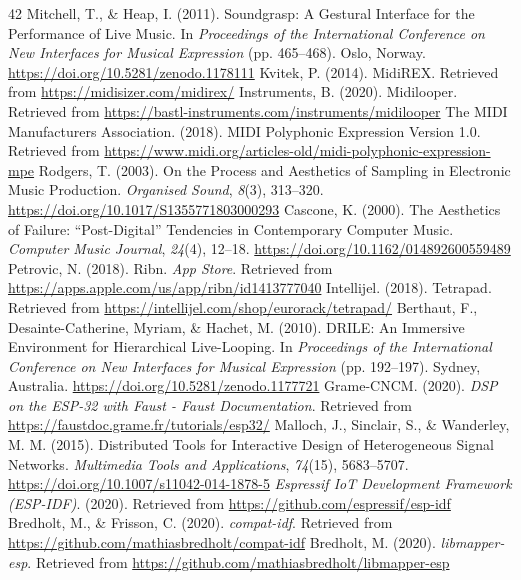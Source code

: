 \documentclass[sigconf]{nimeart}
\begin{document}
\begin{thebibliography}{42}
 {{ }}  Mitchell, T., \& Heap, I. (2011). Soundgrasp: A Gestural Interface for the Performance of Live Music. In \emph{Proceedings of the International Conference on New Interfaces for Musical Expression} (pp. 465--468). Oslo, Norway. \url{https://doi.org/10.5281/zenodo.1178111}{}
 {{ }}  Kvitek, P. (2014). MidiREX. Retrieved from \url{https://midisizer.com/midirex/}{}
 {{ }}  Instruments, B. (2020). Midilooper. Retrieved from \url{https://bastl-instruments.com/instruments/midilooper}{}
 {{ }}  The MIDI Manufacturers Association. (2018). MIDI Polyphonic Expression Version 1.0. Retrieved from \url{https://www.midi.org/articles-old/midi-polyphonic-expression-mpe}{}
 {{ }}  Rodgers, T. (2003). On the Process and Aesthetics of Sampling in Electronic Music Production. \emph{Organised Sound}, \emph{8}(3), 313--320. \url{https://doi.org/10.1017/S1355771803000293}{}
 {{ }}  Cascone, K. (2000). The Aesthetics of Failure: ``Post-Digital'' Tendencies in Contemporary Computer Music. \emph{Computer Music Journal}, \emph{24}(4), 12--18. \url{https://doi.org/10.1162/014892600559489}{}
 {{ }}  Petrovic, N. (2018). Ribn. \emph{App Store}. Retrieved from \url{https://apps.apple.com/us/app/ribn/id1413777040}{}
 {{ }}  Intellijel. (2018). Tetrapad. Retrieved from \url{https://intellijel.com/shop/eurorack/tetrapad/}{}
 {{ }}  Berthaut, F., Desainte-Catherine, Myriam, \& Hachet, M. (2010). DRILE: An Immersive Environment for Hierarchical Live-Looping. In \emph{Proceedings of the International Conference on New Interfaces for Musical Expression} (pp. 192--197). Sydney, Australia. \url{https://doi.org/10.5281/zenodo.1177721}{}
 {{ }}  Grame-CNCM. (2020). \emph{DSP on the ESP-32 with Faust - Faust Documentation}. Retrieved from \url{https://faustdoc.grame.fr/tutorials/esp32/}{}
 {{ }}  Malloch, J., Sinclair, S., \& Wanderley, M. M. (2015). Distributed Tools for Interactive Design of Heterogeneous Signal Networks. \emph{Multimedia Tools and Applications}, \emph{74}(15), 5683--5707. \url{https://doi.org/10.1007/s11042-014-1878-5}{}
 {{ }}  \emph{Espressif IoT Development Framework (ESP-IDF)}. (2020). Retrieved from \url{https://github.com/espressif/esp-idf}{}
 {{ }}  Bredholt, M., \& Frisson, C. (2020). \emph{compat-idf}. Retrieved from \url{https://github.com/mathiasbredholt/compat-idf}{}
 {{ }}  Bredholt, M. (2020). \emph{libmapper-esp}. Retrieved from \url{https://github.com/mathiasbredholt/libmapper-esp}{}

\end{thebibliography}
\end{document}

